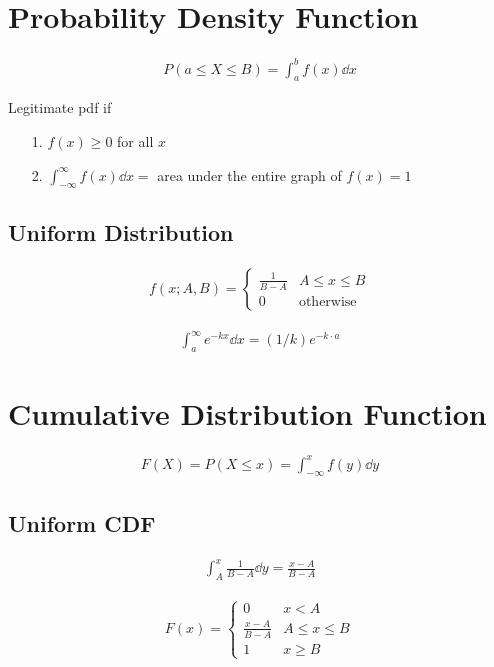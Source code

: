 \documentclass[paper=A4, pagesize, fontsize=7pt, DIV=calc]{scrartcl}
\begin{document}
\begin{minipage}[t]{.45\linewidth}
  \section{Probability Density Function}
  \begin{align*}
    P(a \le X \le B) = \int_{a}^{b} f(x) \dd{x}
  \end{align*}

  Legitimate pdf if
  \begin{enumerate}
    \item[1.]
      $f(x) \ge 0$ for all $x$
    \item[2.]
      $\int_{-\infty}^{\infty} f(x) \dd{x} = $ area under the entire graph of $f(x) = 1$
  \end{enumerate}

  \subsection{Uniform Distribution}
  \begin{align*}
    f(x; A, B) = \begin{cases}
      \frac{1}{B - A} & A \le x \le B \\
      0               & \text{otherwise}
    \end{cases}
  \end{align*}

  \begin{align*}
    \int_{a}^{\infty} e^{-kx} \dd{x} = (1/k)e^{-k \cdot a}
  \end{align*}

  \section{Cumulative Distribution Function}
  \begin{align*}
    F(X) = P(X \le x) = \int_{-\infty}^{x} f(y) \dd{y}
  \end{align*}

  \subsection{Uniform CDF}

  \begin{align*}
    \int_{A}^{x} \frac{1}{B - A} \dd{y} = \frac{x - A}{B - A}
  \end{align*}

  \begin{align*}
    F(x) = \begin{cases}
      0                   & x < A \\
      \frac{x - A}{B - A} & A \le x \le B \\
      1                   & x \ge B
    \end{cases}
  \end{align*}


\end{minipage}
\end{document}
